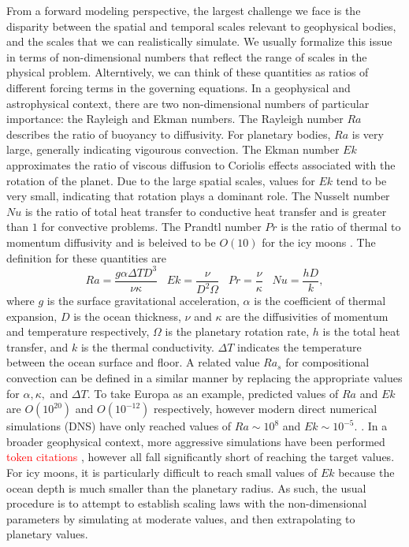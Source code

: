 \documentclass{article}
\def\lb{\left(}
\def\rb{\right)}
\begin{document}
From a forward modeling perspective, the largest challenge we face is the disparity between the spatial and temporal scales relevant to geophysical bodies, and the scales that we can realistically simulate. We usually formalize this issue in terms of non-dimensional numbers that reflect the range of scales in the physical problem. Alterntively, we can think of these quantities as ratios of different forcing terms in the governing equations. 
In a geophysical and astrophysical context, there are two non-dimensional numbers of particular importance: the Rayleigh and Ekman numbers. The Rayleigh number $Ra$ describes the ratio of buoyancy to diffusivity. For planetary bodies, $Ra$ is very large, generally indicating vigourous convection.
The Ekman number $Ek$ approximates the ratio of viscous diffusion to Coriolis effects associated with the rotation of the planet. Due to the large spatial scales, values for $Ek$ tend to be very small, indicating that rotation plays a dominant role.
The Nusselt number $Nu$ is the ratio of total heat transfer to conductive heat transfer and is greater than $1$ for convective problems. The Prandtl number $Pr$ is the ratio of thermal to momentum diffusivity and is beleived to be $O\lb 10\rb $ for the icy moons \citep{kS24}.
The definition for these quantities are
\[Ra = \frac{g\alpha\Delta T D^{3}}{\nu\kappa}\;\;\;Ek = \frac{\nu}{D^{2}\Omega}\;\;\; Pr = \frac{\nu}{\kappa}\;\;\; Nu = \frac{hD}{k},\]
where $g$ is the surface gravitational acceleration, $\alpha$ is the coefficient of thermal expansion, $D$ is the ocean thickness, $\nu$ and $\kappa$ are the diffusivities of momentum and temperature respectively, $\Omega$ is the planetary rotation rate, $h$ is the total heat transfer, and $k$ is the thermal conductivity. $\Delta T$ indicates the temperature between the ocean surface and floor.
A related value $Ra_{s}$ for compositional convection can be defined in a similar manner by replacing the appropriate values for $\alpha,\kappa,$ and $\Delta T.$
To take Europa as an example, predicted values of $Ra$ and  $Ek$ are $O\lb 10^{20}\rb $ and $O\lb 10^{-12}\rb $ respectively, however modern direct numerical simulations (DNS) have only reached values of $Ra \sim 10^{8}$ and $Ek \sim 10^{-5}.$ \citep{dL23}. In a broader geophysical context, more aggressive simulations have been performed \textcolor{red}{token citations \citep{cG19}}, however all fall significantly short of reaching the target values. For icy moons, it is particularly difficult to reach small values of $Ek$ because the ocean depth is much smaller than the planetary radius. As such, the usual procedure is to attempt to establish scaling laws with the non-dimensional parameters by simulating at moderate values, and then extrapolating to planetary values.
\end{document}
